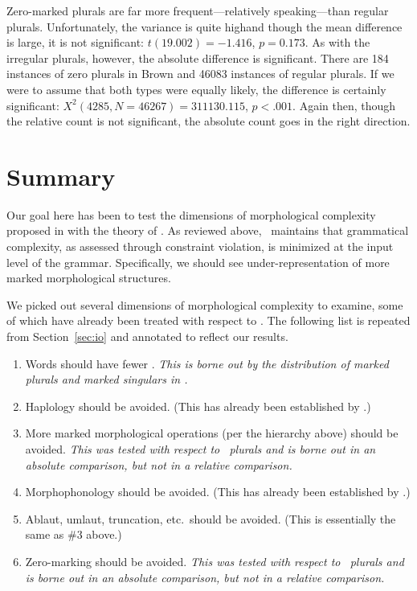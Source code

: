 \documentclass[output=paper,
modfonts
]{LSP/langsci}
\begin{document}
Zero-marked plurals are far more frequent---relatively speaking---than regular plurals. Unfortunately, the variance is quite highand though the mean difference is large, it is not significant: $t(19.002) = -1.416$, $p =  0.173$. As with the irregular plurals, however, the absolute difference is significant. There are 184 instances of zero plurals in Brown and 46083 instances of regular plurals. If we were to assume that both types were equally likely, the difference is certainly significant: $X^2(4285, N = 46267) = 311130.115$, $p < .001$. Again then, though the relative count is not significant, the absolute count goes in the right direction.

\section{Summary}

Our goal here has been to test the dimensions of morphological complexity proposed in \citet{dimensions} with the theory of \io. As reviewed above, \io\ maintains that grammatical complexity, as assessed through constraint violation, is minimized at the input level of the grammar. Specifically, we should see under-representation of more marked morphological structures.

We picked out several dimensions of morphological complexity to examine, some of which have already been treated with respect to \io. The following list is repeated from Section~\ref{sec:io} and annotated to reflect our results.

\begin{enumerate}

\item Words should have fewer . \emph{This is borne out by the distribution of marked plurals and marked singulars in \w.}

\item Haplology should be avoided. (This has already been established by \citealt{inopt.phon}.)

\item More marked morphological operations (per the hierarchy above) should be avoided. \emph{This was tested with respect to \e\ plurals and is borne out in an absolute comparison, but not in a relative comparison.}

\item Morphophonology should be avoided. (This has already been established by \citealt{inopt}.)

\item Ablaut, umlaut, truncation, etc.\ should be avoided. (This is essentially the same as \#3 above.)

\item Zero-marking should be avoided. \emph{This was tested with respect to \e\ plurals and is borne out in an absolute comparison, but not in a relative comparison.}

\end{enumerate}
\end{document}
